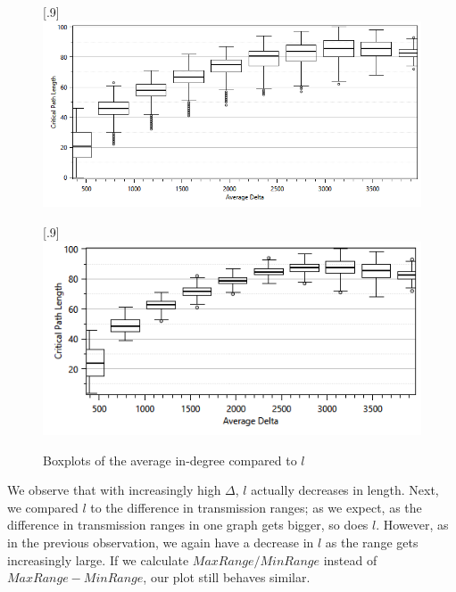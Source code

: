\begin{figure}[ht]
	\centering
	
[.9\linewidth]
{\includegraphics[width=.9\linewidth]{figures/plots/boxplotaveragedeltal.png}}

\end{figure}
\begin{figure}
\ContinuedFloat
{}[.9\linewidth]
{\includegraphics[width=.9\linewidth]{figures/plots/boxplotaveragedeltal8k.png}}

	\caption{Boxplots of the average in-degree compared to $l$}
	\label{fig:boxplotaveragedeltal}
\end{figure}

We observe that with increasingly high $\Delta$, $l$ actually decreases in length. Next, we compared $l$ to the difference in transmission ranges; as we expect, as the difference in transmission ranges in one graph gets bigger, so does $l$. However, as in the previous observation, we again have a decrease in $l$ as the range gets increasingly large. If we calculate $MaxRange/MinRange$ instead of $MaxRange-MinRange$, our plot still behaves similar.


